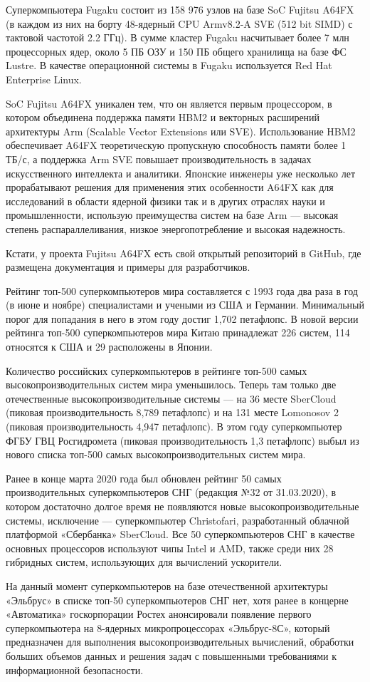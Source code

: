 Суперкомпьютера Fugaku состоит из 158 976 узлов на базе SoC Fujitsu A64FX (в каждом из них на борту 48-ядерный CPU Armv8.2-A SVE (512 bit SIMD) с тактовой частотой 2.2 ГГц). В сумме кластер Fugaku насчитывает более 7 млн процессорных ядер, около 5 ПБ ОЗУ и 150 ПБ общего хранилища на базе ФС Lustre. В качестве операционной системы в Fugaku используется Red Hat Enterprise Linux. 

SoC Fujitsu A64FX уникален тем, что он является первым процессором, в котором объединена поддержка памяти HBM2 и векторных расширений архитектуры Arm (Scalable Vector Extensions или SVE). Использование HBM2 обеспечивает A64FX теоретическую пропускную способность памяти более 1 ТБ/с, а поддержка Arm SVE повышает производительность в задачах искусственного интеллекта и аналитики. Японские инженеры уже несколько лет прорабатывают решения для применения этих особенности A64FX как для исследований в области ядерной физики так и в других отраслях науки и промышленности, использую преимущества систем на базе Arm — высокая степень распараллеливания, низкое энергопотребление и высокая надежность.

Кстати, у проекта Fujitsu A64FX есть свой открытый репозиторий в GitHub, где размещена документация и примеры для разработчиков.

Рейтинг топ-500 суперкомпьютеров мира составляется с 1993 года два раза в год (в июне и ноябре) специалистами и учеными из США и Германии. Минимальный порог для попадания в него в этом году достиг 1,702 петафлопс. В новой версии рейтинга топ-500 суперкомпьютеров мира Китаю принадлежат 226 систем, 114 относятся к США и 29 расположены в Японии.

Количество российских суперкомпьютеров в рейтинге топ-500 самых высокопроизводительных систем мира уменьшилось. Теперь там только две отечественные высокопроизводительные системы — на 36 месте SberCloud (пиковая производительность 8,789 петафлопс) и на 131 месте Lomonosov 2 (пиковая производительность 4,947 петафлопс). В этом году суперкомпьютер ФГБУ ГВЦ Росгидромета (пиковая производительность 1,3 петафлопс) выбыл из нового списка топ-500 самых высокопроизводительных систем мира.

Ранее в конце марта 2020 года был обновлен рейтинг 50 самых производительных суперкомпьютеров СНГ (редакция №32 от 31.03.2020), в котором достаточно долгое время не появляются новые высокопроизводительные системы, исключение — суперкомпьютер Christofari, разработанный облачной платформой «Сбербанка» SberCloud. Все 50 суперкомпьютеров СНГ в качестве основных процессоров используют чипы Intel и AMD, также среди них 28 гибридных систем, использующих для вычислений ускорители.

На данный момент суперкомпьютеров на базе отечественной архитектуры «Эльбрус» в списке топ-50 суперкомпьютеров СНГ нет, хотя ранее в концерне «Автоматика» госкорпорации Ростех анонсировали появление первого суперкомпьютера на 8-ядерных микропроцессорах «Эльбрус-8С», который предназначен для выполнения высокопроизводительных вычислений, обработки больших объемов данных и решения задач с повышенными требованиями к информационной безопасности.
